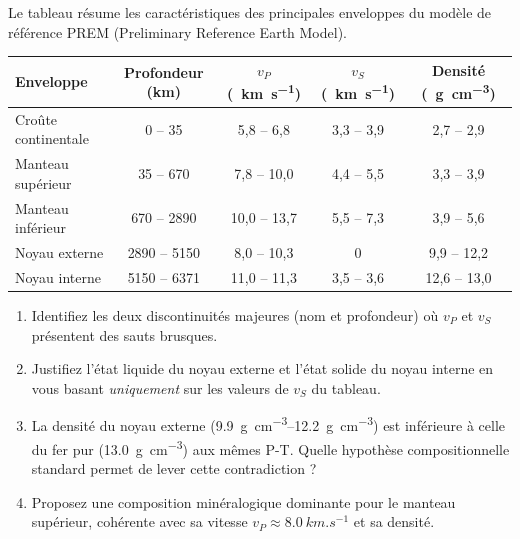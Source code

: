 \documentclass[11pt]{article}
\begin{document}
\begin{exercice}
\noindent Le tableau résume les caractéristiques des principales enveloppes du modèle de référence PREM (Preliminary Reference Earth Model).

\begin{center}
\begin{tabular}{|l|c|c|c|c|}
\hline
Enveloppe & Profondeur (km) & $v_P$ (\SI{}{km.s^{-1}}) & $v_S$ (\SI{}{km.s^{-1}}) & Densité (\SI{}{g.cm^{-3}}) \\
\hline
Croûte continentale & 0 -- 35 & 5,8 -- 6,8 & 3,3 -- 3,9 & 2,7 -- 2,9 \\
\hline
Manteau supérieur & 35 -- 670 & 7,8 -- 10,0 & 4,4 -- 5,5 & 3,3 -- 3,9 \\
\hline
Manteau inférieur & 670 -- 2890 & 10,0 -- 13,7 & 5,5 -- 7,3 & 3,9 -- 5,6 \\
\hline
Noyau externe & 2890 -- 5150 & 8,0 -- 10,3 & 0 & 9,9 -- 12,2 \\
\hline
Noyau interne & 5150 -- 6371 & 11,0 -- 11,3 & 3,5 -- 3,6 & 12,6 -- 13,0 \\
\hline
\end{tabular}
\end{center}

\begin{enumerate}
    \item Identifiez les deux discontinuités majeures (nom et profondeur) où $v_P$ et $v_S$ présentent des sauts brusques.
    \item Justifiez l'état liquide du noyau externe et l'état solide du noyau interne en vous basant \textit{uniquement} sur les valeurs de $v_S$ du tableau.
    \item La densité du noyau externe (\SIrange{9.9}{12.2}{g.cm^{-3}}) est inférieure à celle du fer pur (\SI{13.0}{g.cm^{-3}}) aux mêmes P-T. Quelle hypothèse compositionnelle standard permet de lever cette contradiction ?
    \item Proposez une composition minéralogique dominante pour le manteau supérieur, cohérente avec sa vitesse $v_P \approx \SI{8.0}{km.s^{-1}}$ et sa densité.
\end{enumerate}
\end{exercice}
\end{document}
